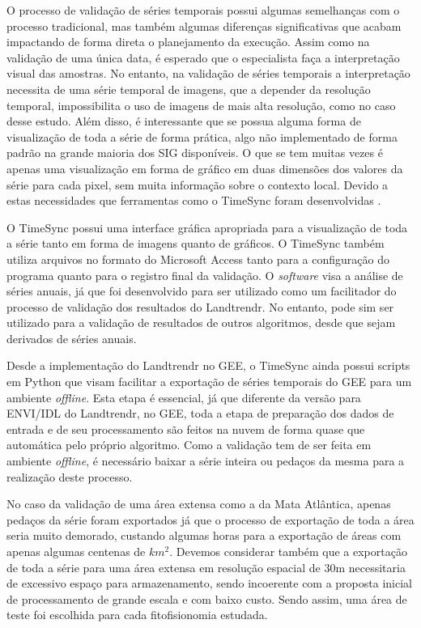 O processo de validação de séries temporais possui algumas semelhanças com o processo tradicional, mas também algumas diferenças significativas que acabam impactando de forma direta o planejamento da execução. Assim como na validação de uma única data, é esperado que o especialista faça a interpretação visual das amostras. No entanto, na validação de séries temporais a interpretação necessita de uma série temporal de imagens, que a depender da resolução temporal, impossibilita o uso de imagens de mais alta resolução, como no caso desse estudo. Além disso, é interessante que se possua alguma forma de visualização de toda a série de forma prática, algo não implementado de forma padrão na grande maioria dos SIG disponíveis. O que se tem muitas vezes é apenas uma visualização em forma de gráfico em duas dimensões dos valores da série para cada pixel, sem muita informação sobre o contexto local. Devido a estas necessidades que ferramentas como o TimeSync foram desenvolvidas \citep{COHEN20102911}.

O TimeSync possui uma interface gráfica apropriada para a visualização de toda a série tanto em forma de imagens quanto de gráficos. O TimeSync também utiliza arquivos no formato do Microsoft Access tanto para a configuração do programa quanto para o registro final da validação. O \textit{software} visa a análise de séries anuais, já que foi desenvolvido para ser utilizado como um facilitador do processo de validação dos resultados do Landtrendr. No entanto, pode sim ser utilizado para a validação de resultados de outros algoritmos, desde que sejam derivados de séries anuais.

Desde a implementação do Landtrendr no GEE, o TimeSync ainda possui scripts em Python que visam facilitar a exportação de séries temporais do GEE para um ambiente \textit{offline}. Esta etapa é essencial, já que diferente da versão para ENVI/IDL do Landtrendr, no GEE, toda a etapa de preparação dos dados de entrada e de seu processamento são feitos na nuvem de forma quase que automática pelo próprio algoritmo. Como a validação tem de ser feita em ambiente \textit{offline}, é necessário baixar a série inteira ou pedaços da mesma para a realização deste processo. 

No caso da validação de uma área extensa como a da Mata Atlântica, apenas pedaços da série foram exportados já que o processo de exportação de toda a área seria muito demorado, custando algumas horas para a exportação de áreas com apenas algumas centenas de $ km^2 $. Devemos considerar também que a exportação de toda a série para uma área extensa em resolução espacial de 30m necessitaria de excessivo espaço para armazenamento, sendo incoerente com a proposta inicial de processamento de grande escala e com baixo custo. 
Sendo assim, uma área de teste foi escolhida para cada fitofisionomia estudada.

